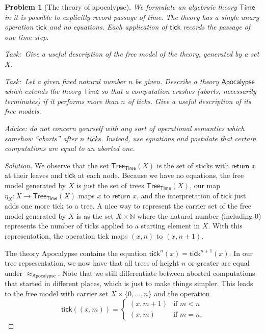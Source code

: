 \documentclass[12pt]{article}
\newtheorem{problem}{Problem}[section]}
\newcommand{\task}{\par\noindent\emph{Task:}\ }
\begin{document}
    \begin{problem}[The theory of apocalypse]
    We formulate an algebraic theory $\mathsf{Time}$ in it is possible to
    explicitly record passage of time. The theory has a single unary
    operation $\mathsf{tick}$ and no equations. Each application of
    $\mathsf{tick}$ records the passage of one time step.

    \task Give a useful description of the free model of the
    theory, generated by a set $X$.

    \task Let a given fixed natural number $n$ be given.
    Describe a theory $\mathsf{Apocalypse}$ which extends the theory
    $\mathsf{Time}$ so that a computation crashes (aborts, necessarily
    terminates) if it performs more than $n$ of ticks. Give a useful
    description of its free models.

    Advice: do \emph{not} concern yourself with any sort of operational
    semantics which somehow ``aborts'' after $n$ ticks. Instead, use
    equations and postulate that certain computations are equal to an
    aborted one.
    \end{problem}
    \begin{proof}[Solution]
        We observe that the set
        $\textsf{Tree}_\textsf{Time}(X)$ is the set of sticks with
        $\textsf{return }x$ at their leaves and $\textsf{tick}$ at each node.
        Because we have no equations, the
        free model generated by $X$ is just the set of trees
        $\textsf{Tree}_\textsf{Time}(X)$, our map
        $\eta_X:X\rightarrow\textsf{Tree}_\textsf{Time}(X)$ maps $x$ to
        $\textsf{return }x$, and the interpretation of $\textsf{tick}$ just adds
        one more \textsf{tick} to a tree. A nice way to represent the carrier
        set of the free model generated by $X$ is as the set $X\times
        \mathbb{N}$ where the natural number (including 0) represents the number
        of ticks applied to a starting element in $X$. With this representation,
        the operation \textsf{tick} maps $(x,n)$ to $(x,n+1)$.

        The theory \textsf{Apocalypse} contains the equation
        $\textsf{tick}^n(x)=\textsf{tick}^{n+1}(x)$. In our tree repsesentation, we
        now have that all trees of height $n$ or greater are equal under
        $\approx_\textsf{Apocalypse}$. Note that we still differentiate between
        aborted computations that started in different places, which is just to
        make things simpler. This leads to the free model with carrier
        set $X\times\{0,\dots,n\}$ and the operation
        \[
            \textsf{tick}((x,m)) = \begin{cases}
                (x,m+1) & \text{if }m<n \\
                (x,m) & \text{if }m=n.
            \end{cases}
        \]
    \end{proof}
\end{document}
